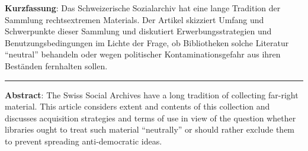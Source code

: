 \textbf{Kurzfassung}: Das Schweizerische Sozialarchiv hat eine lange
Tradition der Sammlung rechtsextremen Materials. Der Artikel skizziert
Umfang und Schwerpunkte dieser Sammlung und diskutiert
Erwerbungsstrategien und Benutzungsbedingungen im Lichte der Frage, ob
Bibliotheken solche Literatur \enquote{neutral} behandeln oder wegen politischer
Kontaminationsgefahr aus ihren Beständen fernhalten sollen.

\begin{center}\rule{0.5\linewidth}{\linethickness}\end{center}

\textbf{Abstract}: The Swiss Social Archives have a long tradition of
collecting far-right material. This article considers extent and
contents of this collection and discusses acquisition strategies and
terms of use in view of the question whether libraries ought to treat
such material \enquote{neutrally} or should rather exclude them to prevent
spreading anti-democratic ideas.
